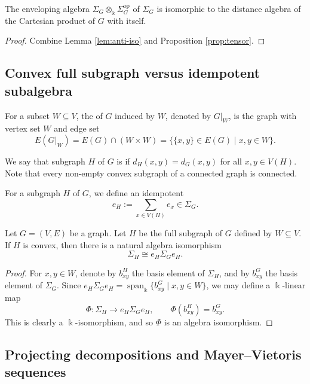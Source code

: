 \documentclass[a4paper,leqno]{amsart}
\begin{document}

\begin{prop}
The enveloping algebra $\Sigma_G\otimes_\Bbbk \Sigma_G^{\operatorname{op}}$ of $\Sigma_G$ is isomorphic to the distance algebra of the Cartesian product of $G$ with itself.
\end{prop}
\begin{proof}
    Combine Lemma \ref{lem:anti-iso} and Proposition \ref{prop:tensor}.
\end{proof}

\subsection{Convex full subgraph versus idempotent subalgebra}\label{subsec:full subgraph}

For a subset $W\subseteq V$, the  of $G$ induced by $W$, denoted by $G|_W$, is the graph with vertex set $W$ and edge set
$$E(G|_W)=E(G)\cap (W\times W)=\bigl\{\{x,y\}\in E(G)\mid x,y\in W\bigr\}.$$

We say that subgraph $H$ of $G$ is   if $d_H(x,y)=d_G(x,y)$ for all $x,y\in V(H)$.  Note that every non-empty convex subgraph of a connected graph is connected.

For a subgraph $H$ of $G$, we define an idempotent
\[e_H:=\sum_{x\in V(H)}e_x\in \Sigma_G.
\]

\begin{lem}\label{lem:corner-convex-subgraph}
Let \(G=(V,E)\) be a graph.  Let $H$ be the full subgraph of $G$ defined by  \(W\subseteq V\).
If $H$ is convex, then there is a natural algebra isomorphism
\[\Sigma_H\cong e_H\Sigma_Ge_H.\]
\end{lem}

\begin{proof}
For \(x,y\in W\), denote by \(b^H_{xy}\) the basis element of \(\Sigma_H\), and by \(b^G_{xy}\) the basis element of \(\Sigma_G\). Since $e_H\Sigma_Ge_H=\operatorname{span}_{\Bbbk}\{b^G_{xy}\mid x,y\in W\}$, we may define a \(\Bbbk\)-linear map
\[\Phi:\Sigma_H\longrightarrow e_H\Sigma_Ge_H,\qquad\Phi(b^H_{xy})=b^G_{xy}.\]
This is clearly a $\Bbbk$-isomorphism, and so  \(\Phi\) is an algebra isomorphism.
\end{proof}

\subsection{Projecting decompositions and Mayer--Vietoris sequences}
\label{subsec:mayer-vietoris}
\end{document}
